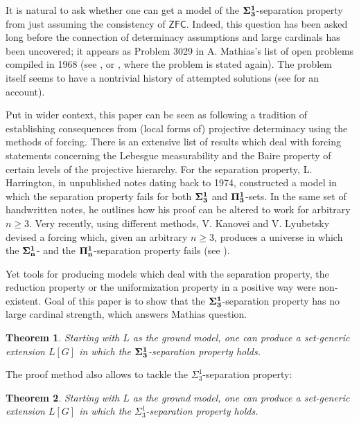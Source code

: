 \documentclass[a4paper,11pt]{article}
\newtheorem*{theorem*}{Theorem}
\newcommand{\ZFC}{\mathsf{ZFC}}
\begin{document}
It is natural to ask whether one can get a model of the $\bf{\Sigma^1_3}$-separation property from just assuming the consistency of $\ZFC$. Indeed, this question has been asked long before the connection of determinacy assumptions and large cardinals has been uncovered; it appears as Problem 3029 in A. Mathias's list of open problems compiled in 1968 (see \cite{Mathias},  or \cite{Kanovei1}, where the problem is stated again).
The problem itself seems to have a nontrivial history of attempted solutions (see \cite{Kanovei2} for an account).


Put in wider context, this paper can be seen as following a tradition of establishing consequences from (local forms of) projective determinacy using the methods of forcing. There is an extensive list of results which deal with forcing statements concerning the Lebesgue measurability and the Baire property of certain levels of the projective hierarchy. For the separation property, L. Harrington, in unpublished notes dating back to 1974, constructed a model in which the separation property fails for both $\bf{\Sigma}^1_3$ and $\bf{\Pi}^1_3$-sets. In the same set of handwritten notes, he outlines how his proof can be altered to work
for arbitrary $n \ge 3$. Very recently, using different methods, V. Kanovei and V. Lyubetsky devised a forcing which, given an arbitrary $n \ge 3$, produces a universe in which the $\bf{\Sigma}^1_n$- and  the $\bf{\Pi}^1_n$-separation property fails (see \cite{Kanovei1}).

Yet tools for producing models which deal with the separation property, the reduction property or the uniformization property in a positive way were non-existent. Goal of this paper is to show that the $\bf{\Sigma^1_3}$-separation property has no large cardinal strength, which answers Mathias question.

\begin{theorem*}
Starting with $L$ as the ground model, one can produce a set-generic extension $L[G]$ in which the $\bf{\Sigma^1_3}$-separation property holds.
\end{theorem*}
The proof method also allows to tackle the $\Sigma^1_3$-separation property:

\begin{theorem*}
Starting with $L$ as the ground model, one can produce a set-generic extension $L[G]$ in which the ${\Sigma^1_3}$-separation property holds.
\end{theorem*}
\end{document}
